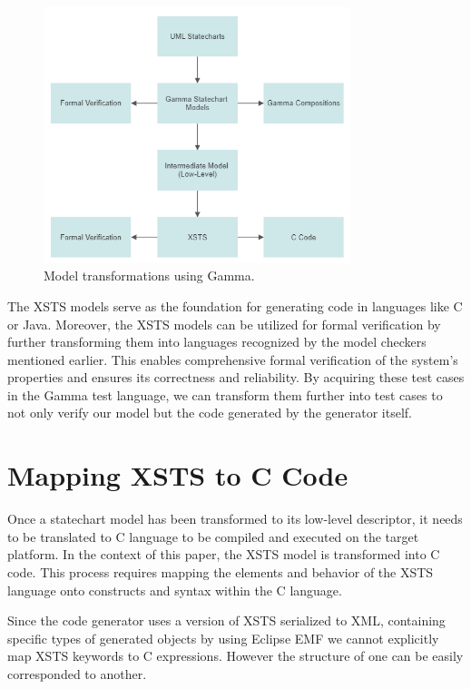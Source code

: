 \begin{figure}[h]
	\centering
	\includegraphics[width=0.8\textwidth]{images/transformation.png}
	\caption{Model transformations using Gamma.\cite{Elosztott}}
	\label{fig:transformation}
\end{figure}

The XSTS models serve as the foundation for generating code in languages like C or Java. Moreover, the XSTS models can be utilized for formal verification by further transforming them into languages recognized by the model checkers mentioned earlier. This enables comprehensive formal verification of the system's properties and ensures its correctness and reliability. By acquiring these test cases in the Gamma test language, we can transform them further into test cases to not only verify our model but the code generated by the generator itself.

\section{Mapping XSTS to C Code}

Once a statechart model has been transformed to its low-level descriptor, it needs to be translated to C language to be compiled and executed on the target platform. In the context of this paper, the XSTS model is transformed into C code. This process requires mapping the elements and behavior of the XSTS language onto constructs and syntax within the C language. 

Since the code generator uses a version of XSTS serialized to XML, containing specific types of generated objects by using Eclipse EMF we cannot explicitly map XSTS keywords to C expressions. However the structure of one can be easily corresponded to another. 

